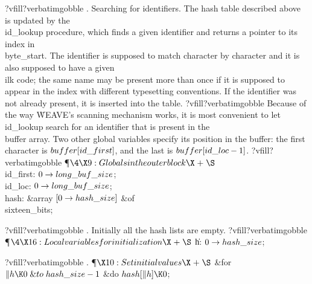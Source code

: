\begingroup \def\tt{\eighttt} \baselineskip9pt
\verbatim
?vfill?verbatimgobble
.  Searching for identifiers.
The hash table described above is updated by the \\{id\_lookup} procedure,
which finds a given identifier and returns a pointer to its index in
\\{byte\_start}. The identifier is supposed to match character by character
and it is also supposed to have a given \\{ilk} code; the same name may be
present more than once if it is supposed to appear in the index with
different typesetting conventions.
If the identifier was not already present, it is inserted into the table.
?vfill?verbatimgobble
Because of the way \.{WEAVE}'s scanning mechanism works, it is most convenient
to let \\{id\_lookup} search for an identifier that is present in the %
\\{buffer}
array. Two other global variables specify its position in the buffer: the
first character is $\\{buffer}[\\{id\_first}]$, and the last is $\\{buffer}[%
\\{id\_loc}-1]$.
?vfill?verbatimgobble
\Y\P$\4\X9:Globals in the outer block\X\mathrel{+}\S$\6
\4\\{id\_first}: $0\to\\{long\_buf\_size}$;\6
\4\\{id\_loc}: $0\to\\{long\_buf\_size}$;\7
\4\\{hash}: \&{array} $[0\to\\{hash\_size}]$ \1\&{of}\5
\\{sixteen\_bits};\2\par
\fi
?vfill?verbatimgobble
. Initially all the hash lists are empty.
?vfill?verbatimgobble
\Y\P$\4\X16:Local variables for initialization\X\mathrel{+}\S$\6
\4\|h: $0\to\\{hash\_size}$;\par
\fi
?vfill?verbatimgobble
. \P$\X10:Set initial values\X\mathrel{+}\S$\6
\&{for} $\|h\K0\mathrel{\&{to}}\\{hash\_size}-1$ \1\&{do}\5
$\\{hash}[\|h]\K0$;\2\par
